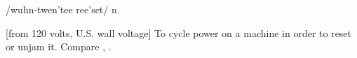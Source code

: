  /wuhn-twen'tee ree'set/ n.

[from 120 volts, U.S. wall voltage] To cycle power on a machine in order
to reset or unjam it. Compare ,
.

